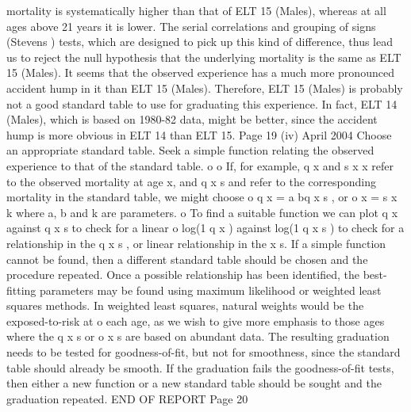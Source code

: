 \documentclass[a4paper,12pt]{article}
\begin{document}
mortality is systematically higher than that of ELT 15 (Males), whereas at all
ages above 21 years it is lower.
The serial correlations and grouping of signs (Stevens ) tests, which are
designed to pick up this kind of difference, thus lead us to reject the null
hypothesis that the underlying mortality is the same as ELT 15 (Males).
It seems that the observed experience has a much more pronounced accident
hump in it than ELT 15 (Males).
Therefore, ELT 15 (Males) is probably not a good standard table to use for
graduating this experience.
In fact, ELT 14 (Males), which is based on 1980-82 data, might be better,
since the accident hump is more obvious in ELT 14 than ELT 15.
Page 19 %
(iv)
April 2004
Choose an appropriate standard table.
Seek a simple function relating the observed experience to that of the standard
table.
o
o
If, for example, q x and
s
x
x refer
to the observed mortality at age x, and q x s and
refer to the corresponding mortality in the standard table, we might choose
o
q x = a bq x s ,
or
o
x
=
s
x
k
where a, b and k are parameters.
o
To find a suitable function we can plot q x against q x s to check for a linear
o
log(1 q x ) against log(1 q x s ) to check for a
relationship in the q x s , or
linear relationship in the
x s.
If a simple function cannot be found, then a different standard table should be
chosen and the procedure repeated.
Once a possible relationship has been identified, the best-fitting parameters
may be found using maximum likelihood or weighted least squares methods.
In weighted least squares, natural weights would be the exposed-to-risk at
o
each age, as we wish to give more emphasis to those ages where the q x s or
o
x s
are based on abundant data.
The resulting graduation needs to be tested for goodness-of-fit, but not for
smoothness, since the standard table should already be smooth.
If the graduation fails the goodness-of-fit tests, then either a new function or a
new standard table should be sought and the graduation repeated.
END OF REPORT
Page 20
\end{document}
